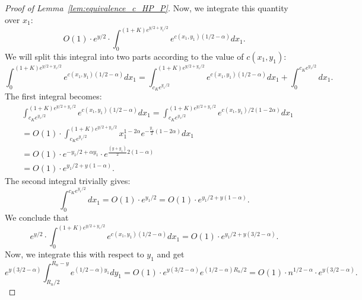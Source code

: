 \begin{proof}[Proof of Lemma~\ref{lem:equivalence_c_HP_P}]
%
% 
%
%
Now, we integrate this quantity over $x_1$: 
$$O(1) \cdot e^{y/2} \cdot \int_0^{(1+K)e^{y/2 + y_1/2}} e^{c(x_1,y_1) (1/2 -\alpha)} dx_1. $$
We will split this integral into two parts according to the value of $c(x_1,y_1)$:
$$
\int_0^{(1+K) e^{y/2 + y_1/2}} e^{c(x_1,y_1) (1/2 -\alpha)} dx_1 = 
\int_{c_K e^{y_1/2}}^{(1+K)e^{y/2 + y_1/2}} e^{c(x_1,y_1) (1/2 -\alpha)} dx_1 + \int_0^{c_K e^{y_1/2}} dx_1.
$$
The first integral becomes: 
\begin{equation*}
\begin{split} 
&\int_{c_K e^{y_1/2}}^{(1+K)e^{y/2 + y_1/2}} e^{c(x_1,y_1) (1/2 -\alpha)} dx_1  = 
\int_{c_K e^{y_1/2}}^{(1+K)e^{y/2 + y_1/2}} e^{c(x_1,y_1)/2 (1 -2\alpha)} dx_1  \\
&= O(1)\cdot \int_{c_K e^{y_1/2}}^{(1+K)e^{y/2 + y_1/2}} x_1^{1 -2\alpha} 
e^{-\frac{y_1}{2} (1-2\alpha)} dx_1 \\
&= O(1) \cdot e^{-y_1/2 + \alpha y_1} \cdot e^{\frac{(y+y_1)}{2} 2(1-\alpha)} \\
&=O(1) \cdot e^{y_1/2 +y(1-\alpha)}.  
\end{split}
\end{equation*}
The second integral trivially gives: 
$$ \int_0^{c_K e^{y_1/2}} dx_1 = O(1) \cdot e^{y_1/2} = O(1) \cdot e^{y_1/2 +y(1-\alpha)}.$$
We conclude that 
$$ e^{y/2} \cdot \int_0^{(1+K)e^{y/2 + y_1/2}} e^{c(x_1,y_1) (1/2 -\alpha)} dx_1 = 
O(1) \cdot e^{y_1/2 +y(3/2-\alpha)}. $$
Now, we integrate this with respect to $y_1$ and get 
$$e^{y(3/2 -\alpha)} \int_{R_n/2}^{R_n-y} e^{(1/2-\alpha)y_1} dy_1 =  O(1) \cdot e^{y(3/2 -\alpha)} 
 e^{(1/2 -\alpha) R_n/2} = O(1) \cdot n^{1/2 -\alpha} \cdot e^{y(3/2 - \alpha)}.$$
\begin{equation} \label{eq:term3_intermediate}

\end{equation}
\end{proof}
